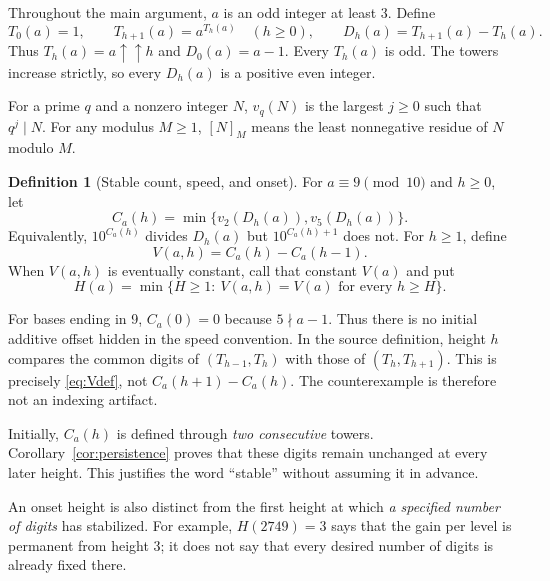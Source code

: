 \documentclass[11pt,letterpaper]{article}
\numberwithin{equation}{section}
\theoremstyle{definition}
\newtheorem{definition}[theorem]{Definition}
\theoremstyle{remark}
\begin{document}
Throughout the main argument, $a$ is an odd integer at least $3$. Define
\begin{equation}\label{eq:towers}
 T_0(a)=1,\qquad T_{h+1}(a)=a^{T_h(a)}\quad(h\ge0),
 \qquad D_h(a)=T_{h+1}(a)-T_h(a).
\end{equation}
Thus $T_h(a)=a\uparrow\uparrow h$ and $D_0(a)=a-1$. Every $T_h(a)$ is odd. The towers increase strictly, so every $D_h(a)$ is a positive even integer.

For a prime $q$ and a nonzero integer $N$, $v_q(N)$ is the largest $j\ge0$ such that $q^j\mid N$. For any modulus $M\ge1$, $[N]_M$ means the least nonnegative residue of $N$ modulo $M$.

\begin{definition}[Stable count, speed, and onset]\label{def:counts}
For $a\equiv9\pmod{10}$ and $h\ge0$, let
\begin{equation}\label{eq:Cdef}
 C_a(h)=\min\{v_2(D_h(a)),v_5(D_h(a))\}.
\end{equation}
Equivalently, $10^{C_a(h)}$ divides $D_h(a)$ but $10^{C_a(h)+1}$ does not. For $h\ge1$, define
\begin{equation}\label{eq:Vdef}
 V(a,h)=C_a(h)-C_a(h-1).
\end{equation}
When $V(a,h)$ is eventually constant, call that constant $V(a)$ and put
\begin{equation}\label{eq:Hdef}
 H(a)=\min\{H\ge1:\ V(a,h)=V(a)\text{ for every }h\ge H\}.
\end{equation}
\end{definition}

For bases ending in 9, $C_a(0)=0$ because $5\nmid a-1$. Thus there is no initial additive offset hidden in the speed convention. In the source definition, height $h$ compares the common digits of $(T_{h-1},T_h)$ with those of $(T_h,T_{h+1})$. This is precisely \eqref{eq:Vdef}, not $C_a(h+1)-C_a(h)$. The counterexample is therefore not an indexing artifact.

Initially, $C_a(h)$ is defined through \emph{two consecutive} towers. Corollary~\ref{cor:persistence} proves that these digits remain unchanged at every later height. This justifies the word ``stable'' without assuming it in advance.

An onset height is also distinct from the first height at which \emph{a specified number of digits} has stabilized. For example, $H(2749)=3$ says that the gain per level is permanent from height 3; it does not say that every desired number of digits is already fixed there.
\end{document}
